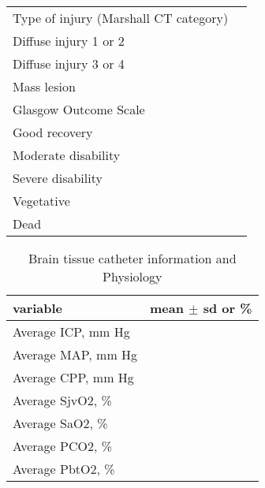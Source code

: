 \documentclass{article}
\begin{document}
\begin{table}[H]
\begin{center}
\begin{tabular}{lc}
Type of injury (Marshall CT category) & \\
\hspace{1 em} Diffuse injury 1 or 2 & \\
\hspace{1 em} Diffuse injury 3 or 4 & \\
\hspace{1 em} Mass lesion & \\
Glasgow Outcome Scale & \\
\hspace{1 em} Good recovery & \\
\hspace{1 em} Moderate disability & \\
\hspace{1 em} Severe disability & \\
\hspace{1 em} Vegetative & \\
\hspace{1 em} Dead & \\
\hline
\end{tabular}
\end{center}
\label{demog}
\end{table}%


\newpage
\begin{table}[H]
\caption{Brain tissue catheter information and Physiology}
\begin{center}
\begin{tabular}{lc}
\hline
variable & mean $\pm$ sd or \%\\
\hline
Average ICP, mm Hg & \\
Average MAP, mm Hg & \\
Average CPP, mm Hg & \\
Average SjvO2, \% & \\
Average SaO2, \% & \\
Average PCO2, \% & \\
Average PbtO2, \% & \\
\hline
\end{tabular}
\end{center}
\label{demog}
\end{table}%
\end{document}
